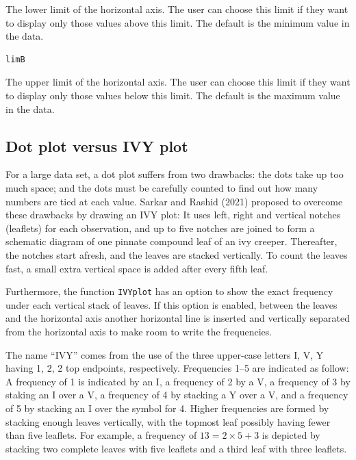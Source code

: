 The lower limit of the horizontal axis. The user can choose this limit
if they want to display only those values above this limit. The default
is the minimum value in the data.

\begin{verbatim}
limB
\end{verbatim}

The upper limit of the horizontal axis. The user can choose this limit
if they want to display only those values below this limit. The default
is the maximum value in the data.

\hypertarget{dot-plot-versus-ivy-plot}{%
\subsection{Dot plot versus IVY plot}\label{dot-plot-versus-ivy-plot}}

For a large data set, a dot plot suffers from two drawbacks: the dots
take up too much space; and the dots must be carefully counted to find
out how many numbers are tied at each value. Sarkar and Rashid (2021)
proposed to overcome these drawbacks by drawing an IVY plot: It uses
left, right and vertical notches (leaflets) for each observation, and up
to five notches are joined to form a schematic diagram of one pinnate
compound leaf of an ivy creeper. Thereafter, the notches start afresh,
and the leaves are stacked vertically. To count the leaves fast, a small
extra vertical space is added after every fifth leaf.

Furthermore, the function \texttt{IVYplot} has an option to show the
exact frequency under each vertical stack of leaves. If this option is
enabled, between the leaves and the horizontal axis another horizontal
line is inserted and vertically separated from the horizontal axis to
make room to write the frequencies.

The name ``IVY'' comes from the use of the three upper-case letters I,
V, Y having 1, 2, 2 top endpoints, respectively. Frequencies 1--5 are
indicated as follow: A frequency of 1 is indicated by an I, a frequency
of 2 by a V, a frequency of 3 by staking an I over a V, a frequency of 4
by stacking a Y over a V, and a frequency of 5 by stacking an I over the
symbol for 4. Higher frequencies are formed by stacking enough leaves
vertically, with the topmost leaf possibly having fewer than five
leaflets. For example, a frequency of \(13=2\times 5+3\) is depicted by
stacking two complete leaves with five leaflets and a third leaf with
three leaflets.

